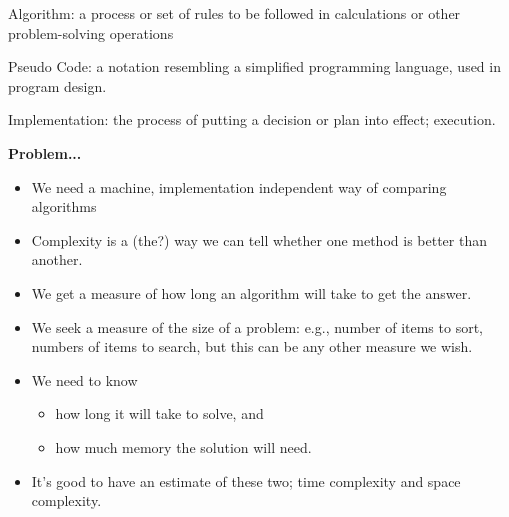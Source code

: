 \documentclass{beamer}
\begin{document}
\begin{frame}
\begin{definition}{Algorithm:}
a process or set of rules to be followed in calculations or other problem-solving operations
\end{definition}

\begin{definition}{Pseudo Code:}
a notation resembling a simplified programming language, used in program design.
\end{definition}

\begin{definition}{Implementation:}
the process of putting a decision or plan into effect; execution.
\end{definition}
\end{frame}

\begin{frame}
\begin{center}
\textbf{Problem...}
\end{center}
\begin{itemize}
\item We need a machine, implementation independent way of comparing algorithms
\end{itemize}
\end{frame} 

\begin{frame}
\begin{itemize}
\item Complexity is a (the?) way we can tell whether one method is better than another.
\item We get a measure of how long an algorithm will take to get the answer.
\item We seek a measure of the size of a problem: e.g., number of items to sort, numbers of items to search, but this can be any other measure we wish.
\end{itemize}
\end{frame} 

\begin{frame}
\begin{itemize}
\item We need to know
\begin{itemize}
\item how long it will take to solve, and
\item how much memory the solution will need.
\end{itemize}
\item It's good to have an estimate of these two; time complexity and space complexity.
\end{itemize}
\end{frame} 
\end{document}

